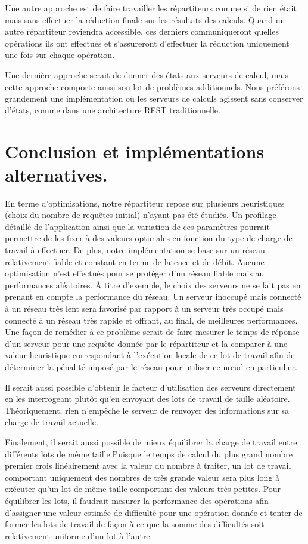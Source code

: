 Une autre approche est de faire travailler les répartiteurs comme si de rien était mais sans effectuer la réduction finale sur les résultats des calculs. Quand un autre répartiteur reviendra accessible, 
ces derniers communiqueront quelles opérations ils ont effectués et s'assureront d'effectuer la réduction uniquement une fois sur chaque opération. 

Une dernière approche serait de donner des états aux serveurs de calcul, mais cette approche comporte aussi son lot de problèmes additionnels. 
Nous préférons grandement une implémentation où les serveurs de calculs agissent sans conserver d'états, comme dans une architecture REST traditionnelle. 

\section{Conclusion et implémentations alternatives.}

En terme d'optimisations, notre répartiteur repose sur plusieurs heuristiques (choix du nombre de requêtes initial) n'ayant pas été étudiés. 
Un profilage détaillé de l'application ainsi que la variation de ces paramètres pourrait permettre de les fixer à des valeurs optimales en fonction
du type de charge de travail à effectuer. De plus, notre implémentation se base sur un réseau relativement fiable et constant en terme de latence et de débit. 
Aucune optimisation n'est effectués pour se protéger d'un réseau fiable mais au performances aléatoires. À titre d'exemple, le choix des serveurs ne se fait pas 
en prenant en compte la performance du réseau. Un serveur inoccupé mais connecté à un réseau très lent sera favorisé par rapport à un serveur très occupé mais connecté
à un réseau très rapide et offrant, au final, de meilleures performances. Une façon de remédier à ce problème serait de faire mesurer le temps de réponse d'un serveur
pour une requête donnée par le répartiteur et la comparer à une valeur heuristique correspondant à l'exécution locale de ce lot de travail afin de déterminer la
pénalité imposé par le réseau pour utiliser ce nœud en particulier. 

Il serait aussi possible d'obtenir le facteur d'utilisation des serveurs directement en les interrogeant plutôt qu'en envoyant des lots de travail de taille 
aléatoire. Théoriquement, rien n'empêche le serveur de renvoyer des informations sur sa charge de travail actuelle.

Finalement, il serait aussi possible de mieux équilibrer la charge de travail entre différents lots de même taille.Puisque le temps de calcul du plus grand nombre premier crois linéairement avec la valeur du nombre à traiter, un lot de travail comportant uniquement des nombres de très grande valeur sera plus long à exécuter qu'un lot de même taille comportant des valeurs très petites. Pour équilibrer les lots, il faudrait mesurer la performance des opérations afin d'assigner une valeur estimée de difficulté pour une opération donnée et tenter de former les lots de travail de façon à ce que la somme des difficultés soit relativement uniforme d'un lot à l'autre. 




%
%
%
%
%
%
